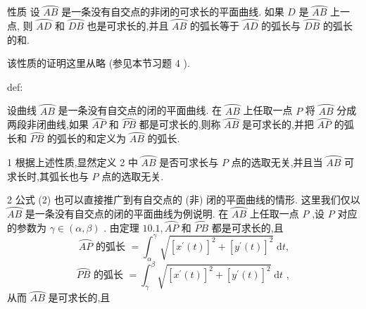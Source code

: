 性质 设 \(\overset{⏜}{AB}\) 是一条没有自交点的非闭的可求长的平面曲线. 如果 \(D\) 是 \(\overset{⏜}{AB}\) 上一点, 则 \(\overset{⏜}{AD}\) 和 \(\overset{⏜}{DB}\) 也是可求长的,并且 \(\overset{⏜}{AB}\) 的弧长等于 \(\overset{⏜}{AD}\) 的弧长与 \(\overset{⏜}{DB}\) 的弧长的和.

该性质的证明这里从略 (参见本节习题 4 ).

\begin{definition}{}{def:}

\end{definition}
设曲线 \(\overset{⏜}{AB}\) 是一条没有自交点的闭的平面曲线. 在 \(\overset{⏜}{AB}\) 上任取一点 \(P\) 将 \(\overset{⏜}{AB}\) 分成两段非闭曲线,如果 \(\overset{⏜}{AP}\) 和 \(\overset{⏜}{PB}\) 都是可求长的,则称 \(\overset{⏜}{AB}\) 是可求长的,并把 \(\overset{⏜}{AP}\) 的弧长和 \(\overset{⏜}{PB}\) 的弧长的和定义为 \(\overset{⏜}{AB}\) 的弧长.

\begin{remark}

\end{remark}
1 根据上述性质,显然定义 2 中 \(\overset{⏜}{AB}\) 是否可求长与 \(P\) 点的选取无关,并且当 \(\overset{⏜}{AB}\) 可求长时,其弧长也与 \(P\) 点的选取无关.

\begin{remark}

\end{remark}
2 公式 (2) 也可以直接推广到有自交点的 (非) 闭的平面曲线的情形. 这里我们仅以 \(\overset{⏜}{AB}\) 是一条没有自交点的闭的平面曲线为例说明. 在 \(\overset{⏜}{AB}\) 上任取一点 \(P\) ,设 \(P\) 对应的参数为 \(\gamma  \in  \left( {\alpha ,\beta }\right)\) . 由定理 \({10.1},\overset{⏜}{AP}\) 和 \(\overset{⏜}{PB}\) 都是可求长的,且
\[
\overset{⏜}{AP}\text{ 的弧长 } = {\int }_{\alpha }^{\gamma }\sqrt{{\left\lbrack  {x}^{\prime }\left( t\right) \right\rbrack  }^{2} + {\left\lbrack  {y}^{\prime }\left( t\right) \right\rbrack  }^{2}}\mathrm{\;d}t,
\]
\[
\overset{⏜}{PB}\text{ 的弧长 } = {\int }_{\gamma }^{\beta }\sqrt{{\left\lbrack  {x}^{\prime }\left( t\right) \right\rbrack  }^{2} + {\left\lbrack  {y}^{\prime }\left( t\right) \right\rbrack  }^{2}}\mathrm{\;d}t\text{ , }
\]
从而 \(\overset{⏜}{AB}\) 是可求长的,且

